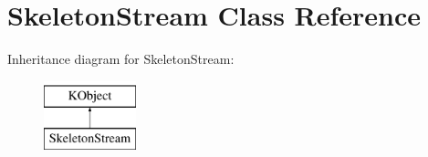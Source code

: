 \hypertarget{class_skeleton_stream}{\section{\-Skeleton\-Stream \-Class \-Reference}
\label{class_skeleton_stream}
}
\-Inheritance diagram for \-Skeleton\-Stream\-:\begin{figure}[H]
\begin{center}
\leavevmode
\includegraphics[height=2.000000cm]{class_skeleton_stream}
\end{center}
\end{figure}

